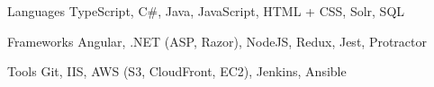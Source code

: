 

\begin{cvskills}

  \cvskill
    {Languages} %
    {TypeScript, C\#, Java, JavaScript, HTML + CSS, Solr, SQL} %

  \cvskill
    {Frameworks} %
    {Angular, .NET (ASP, Razor), NodeJS, Redux, Jest, Protractor} %

  \cvskill
    {Tools} %
    {Git, IIS, AWS (S3, CloudFront, EC2), Jenkins, Ansible} %

\end{cvskills}
